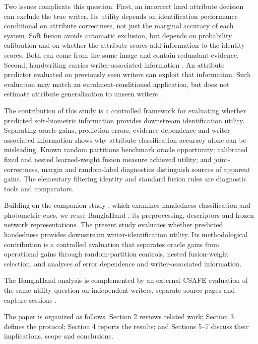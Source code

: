 \documentclass[ASNA,twocolumn]{USG}
\begin{document}
Two issues complicate this question. First, an incorrect hard attribute decision can exclude the true writer. Its utility depends on identification performance conditional on attribute correctness, not just the marginal accuracy of each system. Soft fusion avoids automatic exclusion, but depends on probability calibration and on whether the attribute scores add information to the identity scores. Both can come from the same image and contain redundant evidence. Second, handwriting carries writer-associated information \cite{bulacu2007text,schomaker2007codebooks}. An attribute predictor evaluated on previously seen writers can exploit that information. Such evaluation may match an enrolment-conditioned application, but does not estimate attribute generalization to unseen writers \cite{kaufman2012leakage}.

The contribution of this study is a controlled framework for evaluating whether predicted soft-biometric information provides downstream identification utility. Separating oracle gains, prediction errors, evidence dependence and writer-associated information shows why attribute-classification accuracy alone can be misleading. Known random partitions benchmark oracle opportunity; calibrated fixed and nested learned-weight fusion measure achieved utility; and joint-correctness, margin and random-label diagnostics distinguish sources of apparent gains. The elementary filtering identity and standard fusion rules are diagnostic tools and comparators.

Building on the companion study \cite{prappo2026handedness}, which examines handedness classification and photometric cues, we reuse BanglaHand \cite{banglahand2026data}, its preprocessing, descriptors and frozen network representations. The present study evaluates whether predicted handedness provides downstream writer-identification utility. Its methodological contribution is a controlled evaluation that separates oracle gains from operational gains through random-partition controls, nested fusion-weight selection, and analyses of error dependence and writer-associated information.

The BanglaHand analysis is complemented by an external CSAFE evaluation of the same utility question on independent writers, separate source pages and capture sessions \cite{crawford2020database,crawford2026csafe}.

The paper is organized as follows. Section 2 reviews related work; Section 3 defines the protocol; Section 4 reports the results; and Sections 5--7 discuss their implications, scope and conclusions.
\end{document}

